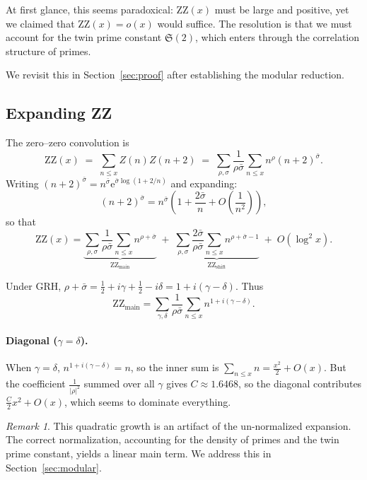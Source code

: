 \documentclass[11pt,a4paper]{article}
\theoremstyle{remark}
\newtheorem{remark}[theorem]{Remark}
\newcommand{\euler}{\mathrm{e}}
\newcommand{\tw}{\mathfrak{S}}
\begin{document}
At first glance, this seems paradoxical: $\mathrm{ZZ}(x)$ must be large and positive, yet we claimed that $\mathrm{ZZ}(x)=o(x)$ would suffice.
The resolution is that we must account for the twin prime constant $\tw(2)$, which enters through the correlation structure of primes.

We revisit this in Section~\ref{sec:proof} after establishing the modular reduction.

\subsection{Expanding ZZ}
\label{sec:ZZ_expand}

The zero--zero convolution is
\begin{equation}\label{eq:ZZ_def}
\mathrm{ZZ}(x) \;=\; \sum_{n\le x}Z(n)Z(n+2)
\;=\; \sum_{\rho,\sigma}\frac{1}{\rho\bar\sigma}\sum_{n\le x}n^{\rho}(n+2)^{\bar\sigma}.
\end{equation}
Writing $(n+2)^{\bar\sigma}=n^{\bar\sigma}\euler^{\bar\sigma\log(1+2/n)}$ and expanding:
\[
(n+2)^{\bar\sigma}=n^{\bar\sigma}\left(1+\frac{2\bar\sigma}{n}+O\!\left(\frac{1}{n^2}\right)\right),
\]
so that
\begin{equation}\label{eq:ZZ_expand}
\mathrm{ZZ}(x)=\underbrace{\sum_{\rho,\sigma}\frac{1}{\rho\bar\sigma}\sum_{n\le x}n^{\rho+\bar\sigma}}_{\mathrm{ZZ}_{\mathrm{main}}}
\;+\;\underbrace{\sum_{\rho,\sigma}\frac{2\bar\sigma}{\rho\bar\sigma}\sum_{n\le x}n^{\rho+\bar\sigma-1}}_{\mathrm{ZZ}_{\mathrm{shift}}}
\;+\;O(\log^2 x).
\end{equation}

Under GRH, $\rho+\bar\sigma=\frac{1}{2}+i\gamma+\frac{1}{2}-i\delta=1+i(\gamma-\delta)$.
Thus
\begin{equation}\label{eq:ZZ_main_explicit}
\mathrm{ZZ}_{\mathrm{main}}=\sum_{\gamma,\delta}\frac{1}{\rho\bar\sigma}\sum_{n\le x}n^{1+i(\gamma-\delta)}.
\end{equation}

\paragraph{Diagonal ($\gamma=\delta$).}
When $\gamma=\delta$, $n^{1+i(\gamma-\delta)}=n$, so the inner sum is $\sum_{n\le x}n=\frac{x^2}{2}+O(x)$.
But the coefficient $\frac{1}{|\rho|^2}$ summed over all $\gamma$ gives $C\approx 1.6468$, so the diagonal contributes $\frac{C}{2}x^2+O(x)$, which seems to dominate everything.

\begin{remark}
This quadratic growth is an artifact of the un-normalized expansion.
The correct normalization, accounting for the density of primes and the twin prime constant, yields a linear main term.
We address this in Section~\ref{sec:modular}.
\end{remark}
\end{document}
